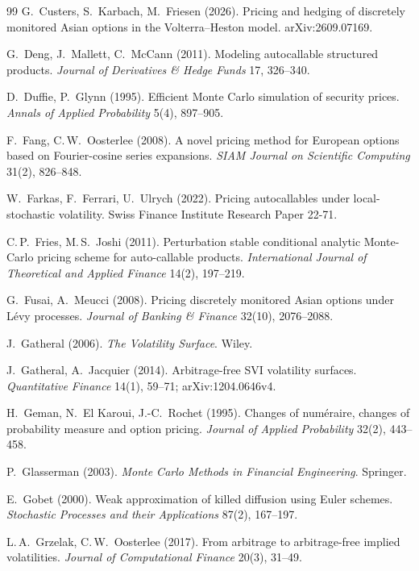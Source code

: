 \begin{thebibliography}{99}
G.~Custers, S.~Karbach, M.~Friesen (2026).
Pricing and hedging of discretely monitored Asian options in the Volterra--Heston model.
arXiv:2609.07169.

G.~Deng, J.~Mallett, C.~McCann (2011).
Modeling autocallable structured products.
\emph{Journal of Derivatives \& Hedge Funds} 17, 326--340.

D.~Duffie, P.~Glynn (1995).
Efficient Monte Carlo simulation of security prices.
\emph{Annals of Applied Probability} 5(4), 897--905.

F.~Fang, C.\,W.~Oosterlee (2008).
A novel pricing method for European options based on Fourier-cosine series expansions.
\emph{SIAM Journal on Scientific Computing} 31(2), 826--848.

W.~Farkas, F.~Ferrari, U.~Ulrych (2022).
Pricing autocallables under local-stochastic volatility.
Swiss Finance Institute Research Paper 22-71.

C.\,P.~Fries, M.\,S.~Joshi (2011).
Perturbation stable conditional analytic Monte-Carlo pricing scheme for auto-callable products.
\emph{International Journal of Theoretical and Applied Finance} 14(2), 197--219.

G.~Fusai, A.~Meucci (2008).
Pricing discretely monitored Asian options under Lévy processes.
\emph{Journal of Banking \& Finance} 32(10), 2076--2088.

J.~Gatheral (2006).
\emph{The Volatility Surface}.
Wiley.

J.~Gatheral, A.~Jacquier (2014).
Arbitrage-free SVI volatility surfaces.
\emph{Quantitative Finance} 14(1), 59--71; arXiv:1204.0646v4.

H.~Geman, N.~El Karoui, J.-C.~Rochet (1995).
Changes of numéraire, changes of probability measure and option pricing.
\emph{Journal of Applied Probability} 32(2), 443--458.

P.~Glasserman (2003).
\emph{Monte Carlo Methods in Financial Engineering}.
Springer.

E.~Gobet (2000).
Weak approximation of killed diffusion using Euler schemes.
\emph{Stochastic Processes and their Applications} 87(2), 167--197.

L.\,A.~Grzelak, C.\,W.~Oosterlee (2017).
From arbitrage to arbitrage-free implied volatilities.
\emph{Journal of Computational Finance} 20(3), 31--49.


\end{thebibliography}
